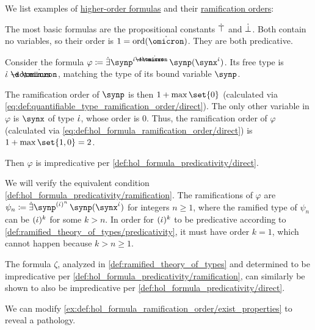 \begin{example}\label{ex:def:hol_formula_ramification_order}
  We list examples of \hyperref[def:hol_term/formula]{higher-order formulas} and their \hyperref[def:hol_formula_ramification_order]{ramification orders}:
  \begin{thmenum}
     The most basic formulas are the propositional constants \( \dot{\top} \) and \( \dot{\bot} \). Both contain no variables, so their order is \( 1 = \ord(\syn\omicron) \). They are both predicative.

     Consider the formula \( \varphi \coloneqq \qexists {\synp^{\syn\iota \synimplies \syn\omicron}} \synp(\synx^{\syn\iota}) \). Its free type is \( \syn\iota \synimplies \syn\omicron \), matching the type of its bound variable \( \synp \).

    The ramification order of \( \synp \) is then \( 1 + \max\set{ 0 } \) (calculated via \eqref{eq:def:quantifiable_type_ramification_order/direct}). The only other variable in \( \varphi \) is \( \synx \) of type \( \dot{\iota} \), whose order is \( 0 \). Thus, the ramification order of \( \varphi \) (calculated via \eqref{eq:def:hol_formula_ramification_order/direct}) is \( 1 + \max\set{ 1, 0 } = 2 \).

    Then \( \varphi \) is impredicative per \cref{def:hol_formula_predicativity/direct}.

    We will verify the equivalent condition \cref{def:hol_formula_predicativity/ramification}. The ramifications of \( \varphi \) are \( \psi_n \coloneqq \qexists {\synp^{(\syn\iota)^n}} \synp(\synx^{\syn\iota}) \) for integers \( n \geq 1 \), where the ramified type of \( \psi_n \) can be \( (\dot{\iota})^k \) for some \( k > n \). In order for \( (\dot{\iota})^k \) to be predicative according to \cref{def:ramified_theory_of_types/predicativity}, it must have order \( k = 1 \), which cannot happen because \( k > n \geq 1 \).

    The formula \( \zeta \), analyzed in \cref{def:ramified_theory_of_types} and determined to be impredicative per \cref{def:hol_formula_predicativity/ramification}, can similarly be shown to also be impredicative per \cref{def:hol_formula_predicativity/direct}.

     We can modify \cref{ex:def:hol_formula_ramification_order/exist_properties} to reveal a pathology.


\end{thmenum}
\end{example}
